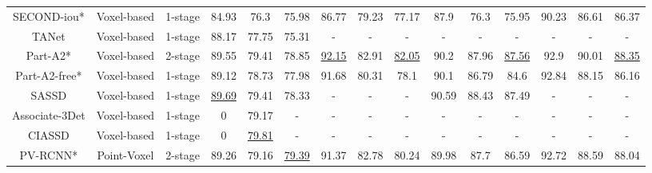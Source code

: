 \begin{table}
{\begin{tabular}{c|c|c|ccc|ccc|ccc|ccc}
		SECOND-iou* \cite{yan2018second}             & Voxel-based                & 1-stage               & 84.93          & 76.3           & 75.98          & 86.77          & 79.23                  & 77.17          & 87.9                   & 76.3           & 75.95          & 90.23          & 86.61          & 86.37           \\
		TANet \cite{liu2020tanet}                   & Voxel-based                & 1-stage               & 88.17          & 77.75          & 75.31          & -              & -                      & -              & -                      & -              & -              & -              & -              & -               \\
		Part-A2* \cite{shi2020points}                 & Voxel-based                & 2-stage               & 89.55          & 79.41          & 78.85          & \uline{92.15}  & 82.91                  & \uline{82.05}  & 90.2                   & 87.96          & \uline{87.56}  & 92.9           & 90.01          & \uline{88.35}   \\
		Part-A2-free* \cite{shi2020points}           & Voxel-based                & 1-stage               & 89.12          & 78.73          & 77.98          & 91.68          & 80.31                  & 78.1           & 90.1                   & 86.79          & 84.6           & 92.84          & 88.15          & 86.16           \\
		SASSD \cite{he2020structure}                   & Voxel-based                & 1-stage               & \uline{89.69}  & 79.41          & 78.33          & -              & -                      & -              & 90.59                  & 88.43          & 87.49          & -              & -              & -               \\
		Associate-3Det \cite{du2020associate}          & Voxel-based                & 1-stage               & 0              & 79.17          & -              & -              & -                      & -              & -                      & -              & -              & -              & -              & -               \\
		CIASSD \cite{zheng2021cia}                  & Voxel-based                & 1-stage               & 0              & \uline{79.81}  & -              & -              & -                      & -              & -                      & -              & -              & -              & -              & -               \\ 
		\hline
		PV-RCNN* \cite{shi2020pv}                & Point-Voxel                & 2-stage               & 89.26          & 79.16          & \uline{79.39}  & 91.37          & 82.78                  & 80.24          & 89.98                  & 87.7           & 86.59          & 92.72          & 88.59          & 88.04           \\

\end{tabular}}
\end{table}
